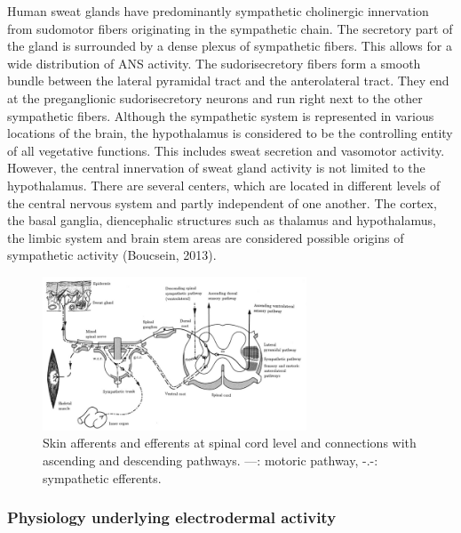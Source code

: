 Human sweat glands have predominantly sympathetic cholinergic innervation from sudomotor fibers originating in the sympathetic chain. The secretory part of the gland is surrounded by a dense plexus of sympathetic fibers. This allows for a wide distribution of ANS activity. The sudorisecretory fibers form a smooth bundle between the lateral pyramidal tract and the anterolateral tract. They end at the preganglionic sudorisecretory neurons and run right next to the other sympathetic fibers.  Although the sympathetic system is represented in various locations of the brain, the hypothalamus is considered to be the controlling entity of all vegetative functions. This includes sweat secretion and vasomotor activity. However, the central innervation of sweat gland activity is not limited to the hypothalamus. There are several centers, which are located in different levels of the central nervous system and partly independent of one another. The cortex, the basal ganglia, diencephalic structures such as thalamus and hypothalamus, the limbic system and brain stem areas are considered possible origins of sympathetic activity (Boucsein, 2013).

\begin{figure}[ht]
\centering
\includegraphics[width=0.7\textwidth]{images/symPathway.png}
\caption{Skin afferents and efferents at spinal cord level and connections with ascending and descending pathways. ---: motoric pathway, -.-: sympathetic efferents. \citep{boucsein2013electrodermal}}
\label{symPathImg}
\end{figure}

\subsubsection{Physiology underlying electrodermal activity}

